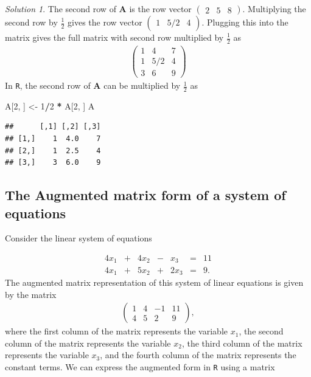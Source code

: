 \documentclass[
]{book}
\newenvironment{Shaded}{\begin{snugshade}}{\end{snugshade}}
\newcommand{\DecValTok}[1]{\textcolor[rgb]{0.00,0.00,0.81}{#1}}
\newcommand{\NormalTok}[1]{#1}
\newcommand{\OperatorTok}[1]{\textcolor[rgb]{0.81,0.36,0.00}{\textbf{#1}}}
\newcommand{\StringTok}[1]{\textcolor[rgb]{0.31,0.60,0.02}{#1}}
\theoremstyle{definition}
\theoremstyle{definition}
\theoremstyle{definition}
\theoremstyle{definition}
\theoremstyle{remark}
\newtheorem*{solution}{Solution}
\begin{document}
\begin{solution}
The second row of \(\mathbf{A}\) is the row vector \(\begin{pmatrix} 2 & 5 & 8 \end{pmatrix}\). Multiplying the second row by \(\frac{1}{2}\) gives the row vector \(\begin{pmatrix} 1 & 5/2 & 4 \end{pmatrix}\). Plugging this into the matrix gives the full matrix with second row multiplied by \(\frac{1}{2}\) as
\[
\begin{aligned}
\begin{pmatrix} 1 & 4 & 7 \\ 1 & 5/2 & 4 \\ 3 & 6 & 9 \end{pmatrix}
\end{aligned}
\]
In \texttt{R}, the second row of \(\mathbf{A}\) can be multiplied by \(\frac{1}{2}\) as

\begin{Shaded}
\begin{Highlighting}[]
\NormalTok{A[}\DecValTok{2}\NormalTok{, ] <-}\StringTok{ }\DecValTok{1}\OperatorTok{/}\DecValTok{2} \OperatorTok{*}\StringTok{ }\NormalTok{A[}\DecValTok{2}\NormalTok{, ]}
\NormalTok{A}
\end{Highlighting}
\end{Shaded}

\begin{verbatim}
##      [,1] [,2] [,3]
## [1,]    1  4.0    7
## [2,]    1  2.5    4
## [3,]    3  6.0    9
\end{verbatim}

\end{solution}

\hypertarget{the-augmented-matrix-form-of-a-system-of-equations}{%
\subsection{The Augmented matrix form of a system of equations}\label{the-augmented-matrix-form-of-a-system-of-equations}}

Consider the linear system of equations

\begin{alignat*}{4}
x_1   & {}+{} & 4 x_2 & {}-{} & x_3 & {}={} & 11 \\
4 x_1 & {}+{} & 5 x_2 & {}+{} & 2 x_3 & {}={} & 9.
\end{alignat*}
The augmented matrix representation of this system of linear equations is given by the matrix
\[
\begin{aligned}
\begin{pmatrix}
1 & 4 & - 1 & 11 \\
4 & 5 & 2   &  9
\end{pmatrix},
\end{aligned}
\]
where the first column of the matrix represents the variable \(x_1\), the second column of the matrix represents the variable \(x_2\), the third column of the matrix represents the variable \(x_3\), and the fourth column of the matrix represents the constant terms. We can express the augmented form in \texttt{R} using a matrix
\end{document}
